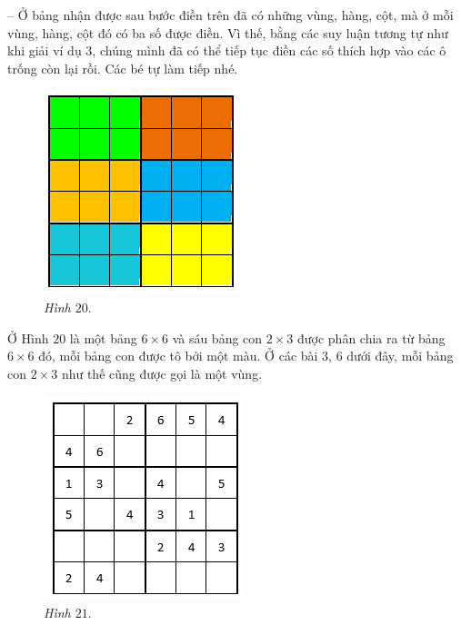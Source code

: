 	-- Ở bảng nhận được sau bước điền trên đã có những vùng, hàng, cột, mà ở mỗi vùng, hàng, cột đó có ba số được điền. Vì thế, bằng các suy luận tương tự như khi giải ví dụ $3$, chúng mình đã có thể tiếp tục điền các số thích hợp vào các ô trống còn lại rồi. Các bé tự làm tiếp nhé.
	\vskip 0.1cm
	\begin{figure}
		\centering
		\vspace*{-30pt}
		\captionsetup{labelformat= empty, justification=centering}
		\includegraphics[scale=0.5]{pic9}
		\vspace*{-5pt}
		\caption{\small\textit{Hình $20.$}}
		\vspace*{-25pt}
	\end{figure}
		Ở Hình $20$ là một bảng $6\times6$ và sáu bảng con $2\times3$ được phân chia ra từ bảng $6\times6$ đó, mỗi bảng con được tô bởi một màu. Ở các bài $3$, $6$ dưới đây, mỗi bảng con $2\times3$ như thế cũng được gọi là một vùng.
		\vskip 0.1cm
		\begin{figure}
			\centering
			\vspace*{-25pt}
			\captionsetup{labelformat= empty, justification=centering}
			\includegraphics[scale=0.5]{pic10}
			\vspace*{-5pt}
			\caption{\small\textit{Hình $21.$}}
			\vspace*{-20pt}
		\end{figure}
